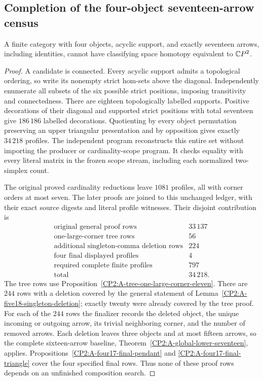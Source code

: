 \subsection{Completion of the four-object seventeen-arrow census}

\begin{theorem}
\label{CP2:A-four-seventeen-complete}
A finite category with four objects, acyclic support, and exactly
seventeen arrows, including identities, cannot have classifying
space homotopy equivalent to $\mathbb{C}P^2$.
\end{theorem}
\begin{proof}
A candidate is connected. Every acyclic support admits a
topological ordering, so write its nonempty strict hom-sets above
the diagonal. Independently enumerate all subsets of the six
possible strict positions, imposing transitivity and connectedness.
There are eighteen topologically labelled supports. Positive
decorations of their diagonal and supported strict positions with
total seventeen give $186\,186$ labelled decorations. Quotienting
by every object permutation preserving an upper triangular
presentation and by opposition gives exactly $34\,218$ profiles.
The independent program
 reconstructs this entire
set without importing the producer or cardinality-scope program.
It checks equality with every literal matrix in the frozen scope
stream, including each normalized two-simplex count.

The original proved cardinality reductions leave $1081$ profiles,
all with corner orders at most seven. The later proofs are joined
to this unchanged ledger, with their exact source digests and
literal profile witnesses. Their disjoint contribution is
\[
\begin{array}{lr}
\text{original general proof rows}&33\,137\\
\text{one-large-corner tree rows}&56\\
\text{additional singleton-comma deletion rows}&224\\
\text{four final displayed profiles}&4\\
\text{required complete finite profiles}&797\\\hline
\text{total}&34\,218.
\end{array}
\]
The tree rows use
Proposition~\ref{CP2:A-tree-one-large-corner-eleven}.
There are $244$ rows with a deletion covered by the general
statement of Lemma~\ref{CP2:A-five18-singleton-deletion}; exactly
twenty were already covered by the tree proof. For each of the
$244$ rows the finalizer records the deleted object, the unique
incoming or outgoing arrow, its trivial neighboring corner, and
the number of removed arrows. Each deletion leaves three objects
and at most fifteen arrows, so the complete sixteen-arrow
baseline, Theorem~\ref{CP2:A-global-lower-seventeen}, applies.
Propositions~\ref{CP2:A-four17-final-pendant} and
\ref{CP2:A-four17-final-triangle} cover the four specified final
rows. Thus none of these proof rows depends on an unfinished
composition search.


\end{proof}
